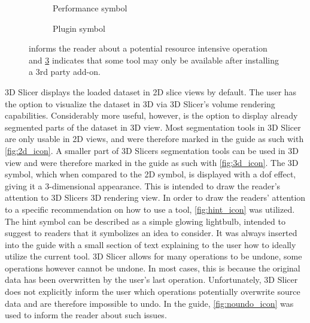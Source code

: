 \begin{figure}[h!]
	\begin{centering}
		\begin{subfigure}{0.5\textwidth}
			
			\caption{Performance symbol}\label{fig:performance_icon}
		\end{subfigure}
		\begin{subfigure}{0.5\textwidth}
			
			\caption{Plugin symbol}\label{fig:plugin_icon}
		\end{subfigure}
	\end{centering}
	\caption{ informs the reader about a potential resource intensive operation and \cref{fig:plugin_icon} indicates that some tool may only be available after installing a 3rd party add-on.}
\end{figure}
\par\medskip
\noindent
3D Slicer displays the loaded dataset in 2D slice views by default.
The user has the option to visualize the dataset in 3D via 3D Slicer's volume rendering capabilities.
Considerably more useful, however, is the option to display already segmented parts of the dataset in 3D view.
Most segmentation tools in 3D Slicer are only usable in 2D views, and were therefore marked in the guide as such with \cref{fig:2d_icon}.
A smaller part of 3D Slicers segmentation tools can be used in 3D view and were therefore marked in the guide as such with \cref{fig:3d_icon}.
The 3D symbol, which when compared to the 2D symbol, is displayed with a \acrfull{dof} effect, giving it a 3-dimensional appearance.
This is intended to draw the reader's attention to 3D Slicers 3D rendering view.
In order to draw the readers' attention to a specific recommendation on how to use a tool, \cref{fig:hint_icon} was utilized.
The hint symbol can be described as a simple glowing lightbulb, intended to suggest to readers that it symbolizes an idea to consider.
It was always inserted into the guide with a small section of text explaining to the user how to ideally utilize the current tool.
3D Slicer allows for many operations to be undone, some operations however cannot be undone.
In most cases, this is because the original data has been overwritten by the user's last operation.
Unfortunately, 3D Slicer does not explicitly inform the user which operations potentially overwrite source data and are therefore impossible to undo.
In the guide, \cref{fig:noundo_icon} was used to inform the reader about such issues.
